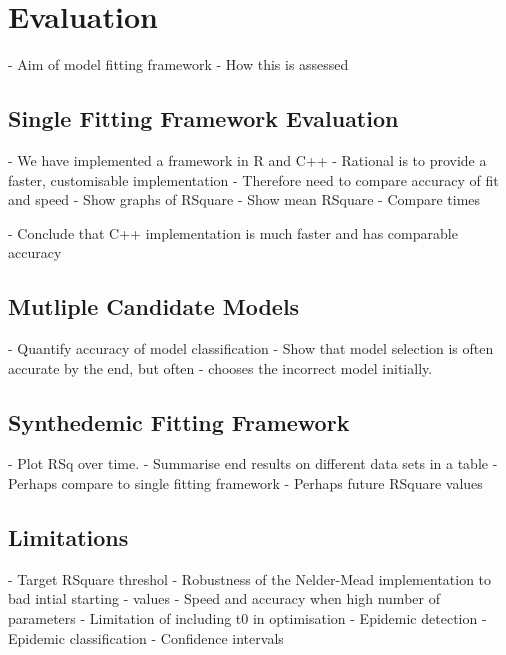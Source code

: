 \chapter{Evaluation}
\label{ch:evaluation}
- Aim of model fitting framework
- How this is assessed

\section{Single Fitting Framework Evaluation}
- We have implemented a framework in R and C++
- Rational is to provide a faster, customisable implementation
- Therefore need to compare accuracy of fit and speed
- Show graphs of RSquare
- Show mean RSquare
- Compare times

- Conclude that C++ implementation is much faster and has comparable
accuracy

\section{Mutliple Candidate Models}
- Quantify accuracy of model classification
- Show that model selection is often accurate by the end, but often
- chooses the incorrect model initially.

\section{Synthedemic Fitting Framework}
- Plot RSq over time.
- Summarise end results on different data sets in a table
- Perhaps compare to single fitting framework
- Perhaps future RSquare values

\section{Limitations}
- Target RSquare threshol
- Robustness of the Nelder-Mead implementation to bad intial starting
- values
- Speed and accuracy when high number of parameters
- Limitation of including t0 in optimisation
- Epidemic detection
- Epidemic classification
- Confidence intervals
